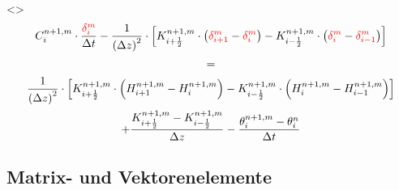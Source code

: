 \documentclass[xcolor=dvipsnames]{beamer}
\newcounter{thirdElement}
\begin{document}
\begin{frame}[t]
\only<\thethirdElement>{
    \begin{gather*}
      C_i^{n+1,m} \cdot \frac{\textcolor{red}{\delta_i^m}}{\Delta t} - \frac{1}{\left(\Delta z\right)^2} \cdot \left[K_{i+\frac{1}{2}}^{n+1,m} \cdot \left(\textcolor{red}{\delta_{i+1}^m} - \textcolor{red}{\delta_i^m}\right) - K_{i-\frac{1}{2}}^{n+1,m} \cdot \left(\textcolor{red}{\delta_i^m} - \textcolor{red}{\delta_{i-1}^m}\right)\right] \\[+0.5mm]
      = \\[+0.5mm]
      \frac{1}{\left(\Delta z\right)^2} \cdot \left[K_{i+\frac{1}{2}}^{n+1,m} \cdot \left(H_{i+1}^{n+1,m} - H_i^{n+1,m}\right) - K_{i-\frac{1}{2}}^{n+1,m} \cdot \left(H_{i}^{n+1,m} - H_{i-1}^{n+1,m}\right)\right] \\[+0.5mm]
      + \frac{K_{i+\frac{1}{2}}^{n+1,m} - K_{i-\frac{1}{2}}^{n+1,m}}{\Delta z} - \frac{\theta_i^{n+1,m}-\theta_i^{n}}{\Delta t}
    \end{gather*}}

\end{frame}

\subsection{Matrix- und Vektorenelemente}  
\end{document}
